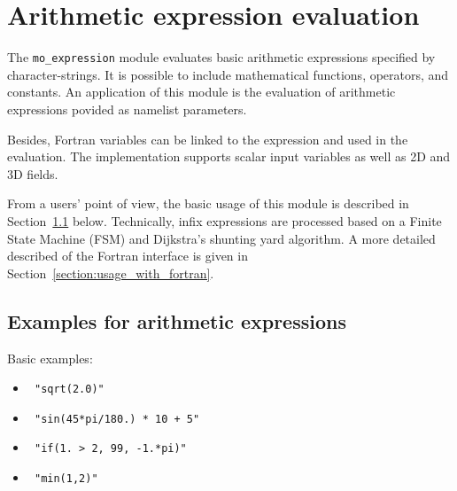 %

\section{Arithmetic expression evaluation}

The \texttt{mo\_expression} module evaluates basic arithmetic
expressions specified by character-strings.
%
It is possible to include mathematical functions, operators, and
constants. 
An application of this module is the evaluation of arithmetic
expressions povided as namelist parameters.

Besides, Fortran variables can be linked to the expression and used in
the evaluation.
The implementation supports scalar input variables as well as 2D and
3D fields.

From a users' point of view, the basic usage of this module is
described in Section~\ref{section:examples_for_arithmetic_expressions}
below.
Technically, infix expressions are processed based on a Finite State
Machine (FSM) and Dijkstra's shunting yard algorithm.
A more detailed described of the Fortran interface is given in
Section~\ref{section:usage_with_fortran}.


\subsection{Examples for arithmetic expressions}
\label{section:examples_for_arithmetic_expressions}

Basic examples:
\begin{itemize}
  \item \texttt{ "sqrt(2.0)" }
  \item \texttt{ "sin(45*pi/180.) * 10 + 5" }
  \item \texttt{ "if(1. > 2, 99, -1.*pi)" }
  \item \texttt{ "min(1,2)" }
\end{itemize}

